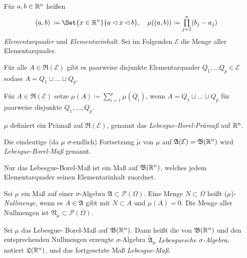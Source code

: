 \documentclass{cheat-sheet}
\newcommand{\PS}{\mathcal{P}} %
\newcommand{\PSO}{\PS(\Omega)} %
\newcommand{\Alg}{\mathfrak{A}} %
\newcommand{\Ring}{\mathfrak{R}} %
\newcommand{\Bor}{\mathfrak{B}} %
\theoremstyle{definition}
\begin{document}
\begin{defn}
  Für $a, b \in \mathbb{R}^n$ heißen
  \[
    \ointerval{a}{b}\,\coloneqq \Set{ x \in \R^n }{ a \lhd x \lhd b }, \quad
    \mu(\ointerval{a}{b}) \coloneqq \prod_{j = 1}^{n} (b_j - a_j)
  \]
  \emph{Elementarquader} und \emph{Elementarinhalt}. Sei im Folgenden $\mathcal{E}$ die Menge aller Elementarquader.
\end{defn}

\begin{satz}
  Für alle $A \in \Ring(\mathcal{E})$ gibt es paarweise disjunkte Elementarquader $Q_1, \ldots Q_p \in \mathcal{E}$ sodass $A = Q_1 \sqcup \ldots \sqcup Q_p$.
\end{satz}

\begin{defn}
  Für $A \in \Ring(\mathcal{E})$ setze $\mu(A) \coloneqq \textstyle\sum_{i = 1}^p \mu(Q_i)$, wenn $A = Q_1 \sqcup \ldots \sqcup Q_p$ für paarweise disjunkte $Q_1, \ldots, Q_p$.
\end{defn}

\begin{satz}
  $\mu$ definiert ein Prämaß auf $\Ring(\mathcal{E})$, genannt das \emph{Lebesgue-Borel-Prämaß} auf $\mathbb{R}^n$.
\end{satz}

\begin{defn}
  Die eindeutige (da $\mu$ $\sigma$-endlich) Fortsetzung $\tilde{\mu}$ von $\mu$ auf $\Alg(\mathcal{E}) = \Bor(\R^n)$ wird \emph{Lebesgue-Borel-Maß} genannt.
\end{defn}

\begin{bem}
  Nur das Lebesgue-Borel-Maß ist ein Maß auf $\Bor(\R^n)$, welches jedem Elementarquader seinen Elementarinhalt zuordnet.
\end{bem}

\begin{defn}
  Sei $\mu$ ein Maß auf einer $\sigma$-Algebra $\Alg \subset \PSO$. Eine Menge $N \subset \Omega$ heißt ($\mu$)-\emph{Nullmenge}, wenn es $A \in \Alg$ gibt mit $N \subset A$ und $\mu(A) = 0$. Die Menge aller Nullmengen ist $\mathfrak{N}_\mu \subset \PSO$.
\end{defn}

\begin{defn}
  Sei $\mu$ das Lebesgue- Borel-Maß auf $\Bor(\R^n)$. Dann heißt die von $\Bor(\R^n)$ und den ent\-sprech\-en\-den Nullmengen erzeugte $\sigma$-Algebra $\tilde{\Alg}_\mu$ \emph{Lebesguesche $\sigma$-Algebra}, notiert $\mathfrak{L}(\mathbb{R}^n)$, und das fortgesetzte Maß \emph{Lebesgue-Maß}.
\end{defn}
\end{document}
